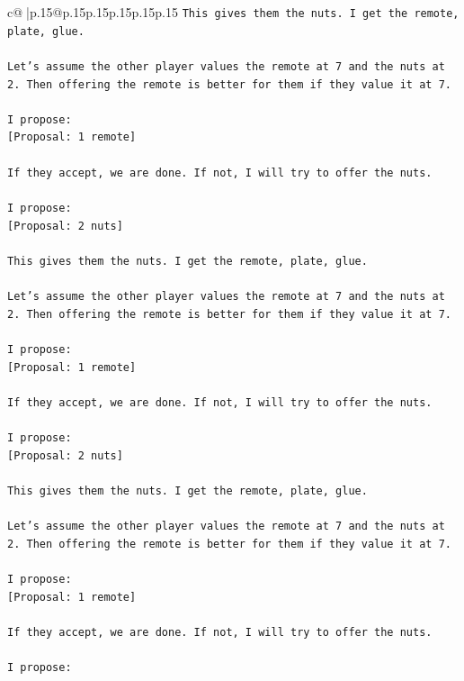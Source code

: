 \documentclass{article}
\begin{document}
{\begin{supertabular}{c@{$\;$}|p{.15\linewidth}@{}p{.15\linewidth}p{.15\linewidth}p{.15\linewidth}p{.15\linewidth}p{.15\linewidth}}
{{{\texttt{This gives them the nuts. I get the remote, plate, glue.} \\
\\ 
\texttt{Let's assume the other player values the remote at 7 and the nuts at 2. Then offering the remote is better for them if they value it at 7.} \\
\\ 
\texttt{I propose:} \\
\texttt{{[}Proposal: 1 remote{]}} \\
\\ 
\texttt{If they accept, we are done. If not, I will try to offer the nuts.} \\
\\ 
\texttt{I propose:} \\
\texttt{{[}Proposal: 2 nuts{]}} \\
\\ 
\texttt{This gives them the nuts. I get the remote, plate, glue.} \\
\\ 
\texttt{Let's assume the other player values the remote at 7 and the nuts at 2. Then offering the remote is better for them if they value it at 7.} \\
\\ 
\texttt{I propose:} \\
\texttt{{[}Proposal: 1 remote{]}} \\
\\ 
\texttt{If they accept, we are done. If not, I will try to offer the nuts.} \\
\\ 
\texttt{I propose:} \\
\texttt{{[}Proposal: 2 nuts{]}} \\
\\ 
\texttt{This gives them the nuts. I get the remote, plate, glue.} \\
\\ 
\texttt{Let's assume the other player values the remote at 7 and the nuts at 2. Then offering the remote is better for them if they value it at 7.} \\
\\ 
\texttt{I propose:} \\
\texttt{{[}Proposal: 1 remote{]}} \\
\\ 
\texttt{If they accept, we are done. If not, I will try to offer the nuts.} \\
\\ 
\texttt{I propose:} \\
}}}
\end{supertabular}}
\end{document}
